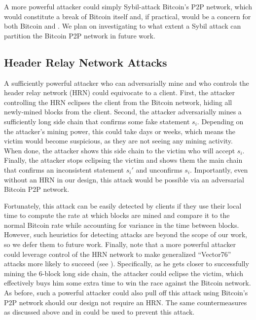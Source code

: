 A more powerful attacker could simply Sybil-attack Bitcoin's P2P network, which would constitute a break of Bitcoin itself and, if practical, would be a concern for both Bitcoin and \Sys.
We plan on investigating to what extent a Sybil attack can partition the Bitcoin P2P network in future work.


\subsection{Header Relay Network Attacks}
\label{sec:attacks:hrn}
A sufficiently powerful attacker who can adversarially mine and who controls the header relay network (HRN) could equivocate to a \Sys client.
First, the attacker controlling the HRN eclipses the client from the Bitcoin network, hiding all newly-mined blocks from the client.
Second, the attacker adversarially mines a sufficiently long side chain that confirms some fake statement $s_i$.
Depending on the attacker's mining power, this could take days or weeks, which means the victim would become suspicious, as they are not seeing any mining activity.
When done, the attacker shows this side chain to the victim who will accept $s_i$.
Finally, the attacker stops eclipsing the victim and shows them the main chain that confirms an inconsistent statement $s_i'$ and unconfirms $s_i$.
Importantly, even without an HRN in our design, this attack would be possible via an adversarial Bitcoin P2P network\cite{eclipse}.

Fortunately, this attack can be easily detected by \Sys clients if they use their local time to compute the rate at which blocks are mined and compare it to the normal Bitcoin rate while accounting for variance in the time between blocks.
However, such heuristics for detecting attacks are beyond the scope of our work, so we defer them to future work.
Finally, note that a more powerful attacker could leverage control of the HRN network to make generalized ``Vector76'' attacks more likely to succeed (see ).
Specifically, as he gets closer to successfully mining the 6-block long side chain, the attacker could eclipse the victim, which effectively buys him some extra time to win the race against the Bitcoin network.
As before, such a powerful attacker could also pull off this attack using Bitcoin's P2P network should our design not require an HRN.
The same countermeasures as discussed above and in  could be used to prevent this attack.
